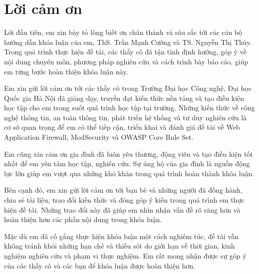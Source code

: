 \chapter*{Lời cảm ơn}

Lời đầu tiên, em xin bày tỏ lòng biết ơn chân thành và sâu sắc tới các cán bộ hướng dẫn khóa luận của em, ThS. Trần Mạnh Cường và TS. Nguyễn Thị Thủy. Trong quá trình thực hiện đề tài, các thầy cô đã tận tình định hướng, góp ý về nội dung chuyên môn, phương pháp nghiên cứu và cách trình bày báo cáo, giúp em từng bước hoàn thiện khóa luận này.

Em xin gửi lời cảm ơn tới các thầy cô trong Trường Đại học Công nghệ, Đại học Quốc gia Hà Nội đã giảng dạy, truyền đạt kiến thức nền tảng và tạo điều kiện học tập cho em trong suốt quá trình học tập tại trường. Những kiến thức về công nghệ thông tin, an toàn thông tin, phát triển hệ thống và tư duy nghiên cứu là cơ sở quan trọng để em có thể tiếp cận, triển khai và đánh giá đề tài về Web Application Firewall, ModSecurity và OWASP Core Rule Set.

Em cũng xin cảm ơn gia đình đã luôn yêu thương, động viên và tạo điều kiện tốt nhất để em yên tâm học tập, nghiên cứu. Sự ủng hộ của gia đình là nguồn động lực lớn giúp em vượt qua những khó khăn trong quá trình hoàn thành khóa luận.

Bên cạnh đó, em xin gửi lời cảm ơn tới bạn bè và những người đã đồng hành, chia sẻ tài liệu, trao đổi kiến thức và đóng góp ý kiến trong quá trình em thực hiện đề tài. Những trao đổi này đã giúp em nhìn nhận vấn đề rõ ràng hơn và hoàn thiện hơn các phần nội dung trong khóa luận.

Mặc dù em đã cố gắng thực hiện khóa luận một cách nghiêm túc, đề tài vẫn không tránh khỏi những hạn chế và thiếu sót do giới hạn về thời gian, kinh nghiệm nghiên cứu và phạm vi thực nghiệm. Em rất mong nhận được sự góp ý của các thầy cô và các bạn để khóa luận được hoàn thiện hơn.
